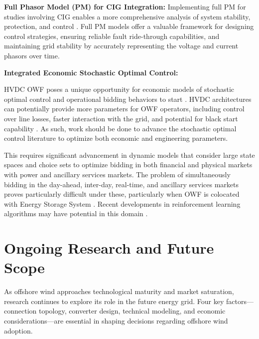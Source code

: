 \documentclass{ieeeaccess}
\begin{document}
\textbf{Full Phasor Model (PM) for CIG Integration:} Implementing full PM for studies involving CIG enables a more comprehensive analysis of system stability, protection, and control \cite{lacerda2022phasor}. Full PM models offer a valuable framework for designing control strategies, ensuring reliable fault ride-through capabilities, and maintaining grid stability by accurately representing the voltage and current phasors over time. %

\textbf{Integrated Economic Stochastic Optimal Control:}

HVDC OWF poses a unique opportunity for economic models of stochastic optimal control and operational bidding behaviors to start \cite{rinaldi2021incorporating,sun2019vsc,rabiee2014information}. HVDC architectures can potentially provide more parameters for OWF operators, including control over line losses, faster interaction with the grid, and potential for black start capability \cite{sakamuri2019black}. As such, work should be done to advance the stochastic optimal control literature to optimize both economic and engineering parameters. 

This requires significant advancement in dynamic models that consider large state spaces and choice sets to optimize bidding in both financial and physical markets with power and ancillary services markets. The problem of simultaneously bidding in the day-ahead, inter-day, real-time, and ancillary services markets proves particularly difficult under these, particularly when OWF is colocated with Energy Storage System \cite{shahmohammadi2018market,cciccek2021optimal}. Recent developments in reinforcement learning algorithms may have potential in this domain \cite{wu2022strategic}.

\section{\textbf{Ongoing Research and Future Scope}}

As offshore wind approaches technological maturity and market saturation, research continues to explore its role in the future energy grid. Four key factors—{connection topology, converter design, technical modeling, and economic considerations}—are essential in shaping decisions regarding offshore wind adoption.
\end{document}
